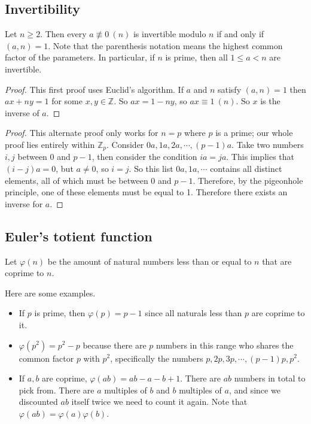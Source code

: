\subsection{Invertibility}
\begin{proposition}
	Let \(n \geq 2\).
	Then every \(a \not\equiv 0\ (n)\) is invertible modulo \(n\) if and only if \((a, n) = 1\).
	Note that the parenthesis notation means the highest common factor of the parameters.
	In particular, if \(n\) is prime, then all \(1 \leq a < n\) are invertible.
\end{proposition}
\begin{proof}
	This first proof uses Euclid's algorithm.
	If \(a\) and \(n\) satisfy \((a, n) = 1\) then \(ax + ny = 1\) for some \(x, y \in \mathbb Z\).
	So \(ax = 1 - ny\), so \(ax \equiv 1\ (n)\).
	So \(x\) is the inverse of \(a\).
\end{proof}
\begin{proof}
	This alternate proof only works for \(n=p\) where \(p\) is a prime; our whole proof lies entirely within \(\mathbb Z_p\).
	Consider \(0a, 1a, 2a, \cdots, (p-1)a\).
	Take two numbers \(i, j\) between 0 and \(p-1\), then consider the condition \(ia = ja\).
	This implies that \((i - j)a = 0\), but \(a \neq 0\), so \(i=j\).
	So this list \(0a, 1a, \cdots\) contains all distinct elements, all of which must be between 0 and \(p-1\).
	Therefore, by the pigeonhole principle, one of these elements must be equal to 1.
	Therefore there exists an inverse for \(a\).
\end{proof}

\subsection{Euler's totient function}
\begin{definition}
	Let \(\varphi(n)\) be the amount of natural numbers less than or equal to \(n\) that are coprime to \(n\).
\end{definition}
Here are some examples.
\begin{itemize}
	\item If \(p\) is prime, then \(\varphi(p) = p - 1\) since all naturals less than \(p\) are coprime to it.
	\item \(\varphi(p^2) = p^2 - p\) because there are \(p\) numbers in this range who shares the common factor \(p\) with \(p^2\), specifically the numbers \(p, 2p, 3p, \cdots, (p-1)p, p^2\).
	\item If \(a, b\) are coprime, \(\varphi(ab) = ab - a - b + 1\).
	      There are \(ab\) numbers in total to pick from.
	      There are \(a\) multiples of \(b\) and \(b\) multiples of \(a\), and since we discounted \(ab\) itself twice we need to count it again.
	      Note that \(\varphi(ab) = \varphi(a)\varphi(b)\).
\end{itemize}

